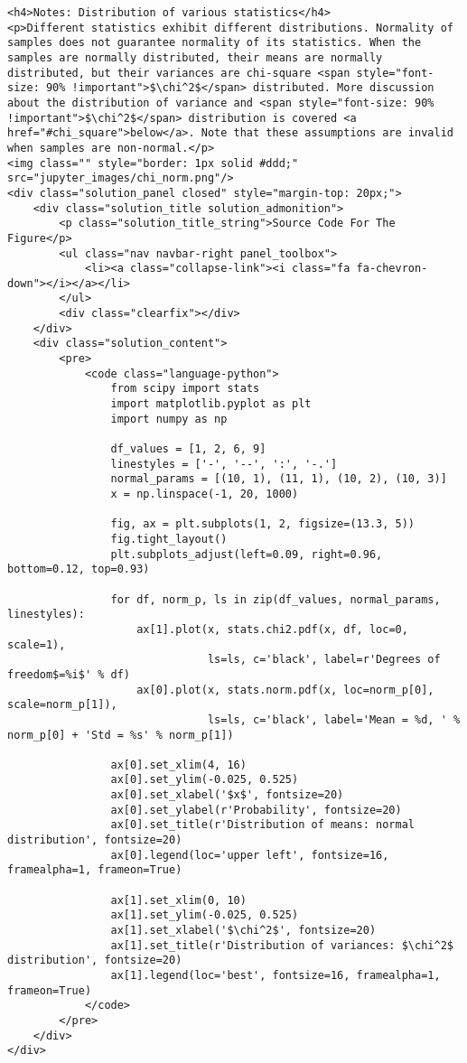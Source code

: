 \documentclass[11pt]{article}
\begin{document}
\begin{verbatim}
<h4>Notes: Distribution of various statistics</h4>
<p>Different statistics exhibit different distributions. Normality of samples does not guarantee normality of its statistics. When the samples are normally distributed, their means are normally distributed, but their variances are chi-square <span style="font-size: 90% !important">$\chi^2$</span> distributed. More discussion about the distribution of variance and <span style="font-size: 90% !important">$\chi^2$</span> distribution is covered <a href="#chi_square">below</a>. Note that these assumptions are invalid when samples are non-normal.</p>
<img class="" style="border: 1px solid #ddd;" src="jupyter_images/chi_norm.png"/>
<div class="solution_panel closed" style="margin-top: 20px;">
    <div class="solution_title solution_admonition">
        <p class="solution_title_string">Source Code For The Figure</p>
        <ul class="nav navbar-right panel_toolbox">
            <li><a class="collapse-link"><i class="fa fa-chevron-down"></i></a></li>
        </ul>
        <div class="clearfix"></div>
    </div>
    <div class="solution_content">
        <pre>
            <code class="language-python">
                from scipy import stats
                import matplotlib.pyplot as plt
                import numpy as np

                df_values = [1, 2, 6, 9]
                linestyles = ['-', '--', ':', '-.']
                normal_params = [(10, 1), (11, 1), (10, 2), (10, 3)]
                x = np.linspace(-1, 20, 1000)

                fig, ax = plt.subplots(1, 2, figsize=(13.3, 5))
                fig.tight_layout()
                plt.subplots_adjust(left=0.09, right=0.96, bottom=0.12, top=0.93)

                for df, norm_p, ls in zip(df_values, normal_params, linestyles):
                    ax[1].plot(x, stats.chi2.pdf(x, df, loc=0, scale=1),
                               ls=ls, c='black', label=r'Degrees of freedom$=%i$' % df)
                    ax[0].plot(x, stats.norm.pdf(x, loc=norm_p[0], scale=norm_p[1]), 
                               ls=ls, c='black', label='Mean = %d, ' % norm_p[0] + 'Std = %s' % norm_p[1])

                ax[0].set_xlim(4, 16)
                ax[0].set_ylim(-0.025, 0.525)
                ax[0].set_xlabel('$x$', fontsize=20)
                ax[0].set_ylabel(r'Probability', fontsize=20)
                ax[0].set_title(r'Distribution of means: normal distribution', fontsize=20)
                ax[0].legend(loc='upper left', fontsize=16, framealpha=1, frameon=True)

                ax[1].set_xlim(0, 10)
                ax[1].set_ylim(-0.025, 0.525)
                ax[1].set_xlabel('$\chi^2$', fontsize=20)
                ax[1].set_title(r'Distribution of variances: $\chi^2$ distribution', fontsize=20)
                ax[1].legend(loc='best', fontsize=16, framealpha=1, frameon=True)
            </code>
        </pre>
    </div>
</div>
\end{verbatim}
\end{document}
